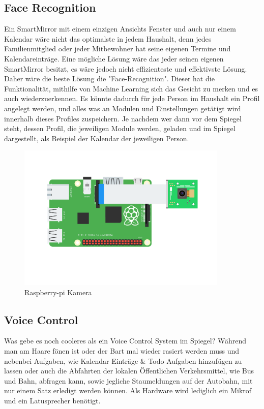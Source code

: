 \subsection{Face Recognition}
Ein SmartMirror mit einem einzigen Ansichts Fenster und auch nur einem Kalendar wäre nicht das optimalste in jedem Haushalt, denn jedes Familienmitglied oder jeder Mitbewohner hat seine eigenen Termine und Kalendareinträge. Eine mögliche Lösung wäre das jeder seinen eigenen SmartMirror besitzt, es wäre jedoch nicht effizienteste und effektivste Lösung. Daher wäre die beste Lösung die "Face-Recognition". Dieser hat die Funktionalität, mithilfe von Machine Learning sich das Gesicht zu merken und es auch wiederzuerkennen. Es könnte dadurch für jede Person im Haushalt ein Profil angelegt werden, und alles was an Modulen und Einstellungen getätigt wird innerhalb dieses Profiles zuspeichern. Je nachdem wer dann vor dem Spiegel steht, dessen Profil, die jeweiligen Module werden, geladen und im Spiegel dargestellt, als Beispiel der Kalendar der jeweiligen Person. 
\begin{figure}
\includegraphics[width=100mm]{pictures/raspberry-pi-camera-2.png}
\caption{Raspberry-pi Kamera}
\end{figure}
\subsection{Voice Control}
Was gebe es noch cooleres als ein Voice Control System im Spiegel? Während man am Haare fönen ist oder der Bart mal wieder rasiert werden muss und nebenbei Aufgaben, wie Kalendar Einträge \& Todo-Aufgaben hinzufügen zu lassen oder auch die Abfahrten der lokalen Öffentlichen Verkehrsmittel, wie Bus und Bahn,  abfragen kann, sowie jegliche Staumeldungen auf der Autobahn, mit nur einem Satz erledigt werden können. Als Hardware wird lediglich ein Mikrof und ein Latusprecher benötigt.

